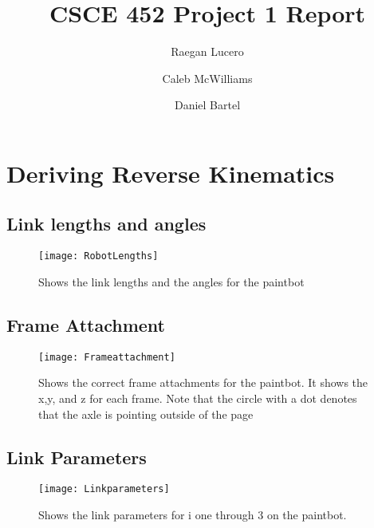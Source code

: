\documentclass{article}
\title{CSCE 452 Project 1 Report}
\author{Raegan Lucero
\and
 Caleb McWilliams
\and
 Daniel Bartel}
\date{}
\begin{document}
\maketitle

\section*{Deriving Reverse Kinematics}

\subsection*{Link lengths and angles}

\begin{figure}[H]
\centering
\texttt{[image: RobotLengths]}
\caption{Shows the link lengths and the angles for the paintbot}
\label{fig:figure1}
\end{figure}


\subsection*{Frame Attachment}

\begin{figure}[H]
\centering
\texttt{[image: Frameattachment]}
\caption{Shows the correct frame attachments for the paintbot. It shows the x,y, and z for each frame. Note that the circle with a dot denotes that the axle is pointing outside of the page}
\label{fig:figure2}
\end{figure}




\subsection*{Link Parameters}

\begin{figure}[H]
\centering
\texttt{[image: Linkparameters]}
\caption{Shows the link parameters for i one through 3 on the paintbot.}
\label{fig:chart1}
\end{figure}
\end{document}
